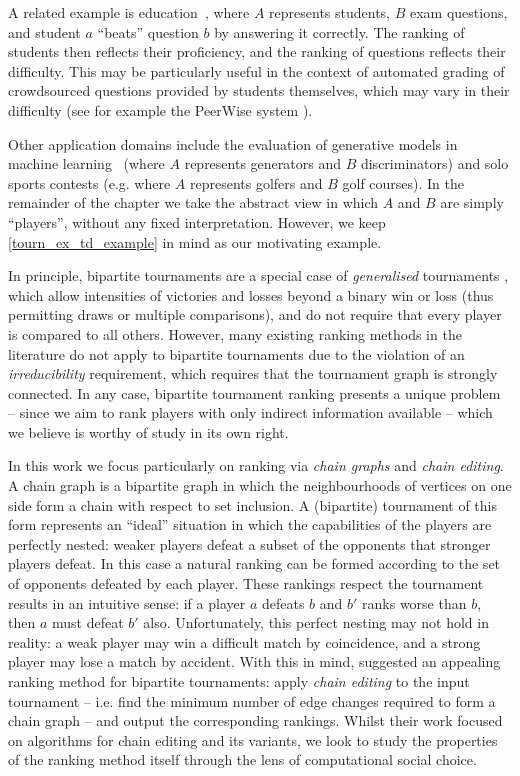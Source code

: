 \label{tourn_education_example}
A related example is education~\cite{jiao2017algorithms}, where $A$ represents
students, $B$ exam questions, and student $a$ ``beats'' question $b$ by
answering it correctly. The ranking of students then reflects their
proficiency, and the ranking of questions reflects their difficulty. This may
be particularly useful in the context of automated grading of crowdsourced
questions provided by students themselves, which may vary in their difficulty
(see for example the PeerWise system \cite{denny_peerwise_2008}).

Other application domains include the evaluation of generative models in
machine learning~\cite{olsson2018skill} (where $A$ represents generators and
$B$ discriminators) and solo sports contests (e.g. where $A$ represents golfers
and $B$ golf courses). In the remainder of the chapter we take the abstract
view in which $A$ and $B$ are simply ``players'', without any fixed
interpretation. However, we keep \cref{tourn_ex_td_example} in mind as our
motivating example.

In principle, bipartite tournaments are a special case of \emph{generalised}
tournaments
\cite{gonzalez2014paired,slutzki2005ranking,csato2019impossibility}, which
allow intensities of victories and losses beyond a binary win or loss (thus
permitting draws or multiple comparisons), and do not require that every
player is compared to all others. However, many existing ranking methods in
the literature do not apply to bipartite tournaments due to the violation of an
\emph{irreducibility} requirement, which requires that the tournament graph is
strongly connected. In any case, bipartite tournament ranking presents a unique
problem -- since we aim to rank players with only indirect information
available -- which we believe is worthy of study in its own right.

In this work we focus particularly on ranking via \emph{chain graphs} and
\emph{chain editing}. A chain graph is a bipartite graph in which the
neighbourhoods of vertices on one side form a chain with respect to set
inclusion. A (bipartite) tournament of this form represents an ``ideal''
situation in which the capabilities of the players are perfectly nested: weaker
players defeat a subset of the opponents that stronger players defeat. In this
case a natural ranking can be formed according to the set of opponents defeated
by each player. These rankings respect the tournament results in an intuitive
sense: if a player $a$ defeats $b$ and $b'$ ranks worse than $b$, then $a$ must
defeat $b'$ also.
%
Unfortunately, this perfect nesting may not hold in reality: a weak player may
win a difficult match by coincidence, and a strong player may lose a match by
accident.
%
With this in mind, \textcite{jiao2017algorithms} suggested an appealing ranking
method for bipartite tournaments: apply \emph{chain editing} to the input
tournament -- i.e. find the minimum number of edge changes required to form a
chain graph -- and output the corresponding rankings. Whilst their work
focused on algorithms for chain editing and its variants, we look to study the
properties of the ranking method itself through the lens of computational social
choice.

